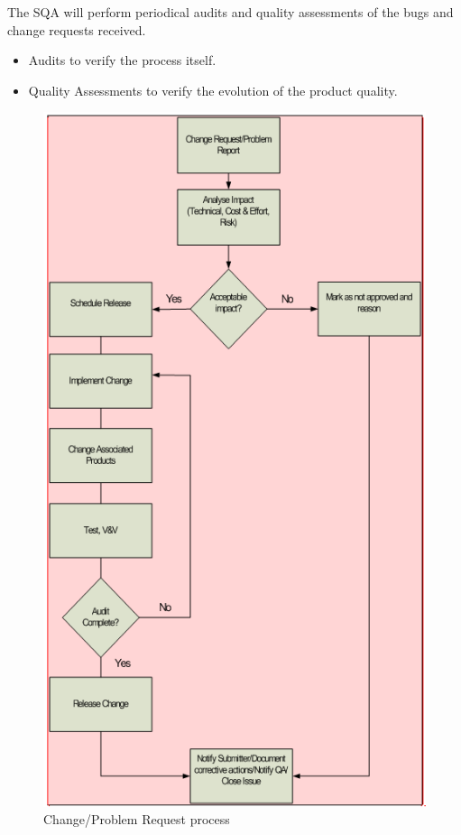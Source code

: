 \documentclass{template/openetcs_article}
\begin{document}
The SQA will perform periodical audits and quality assessments of the bugs and change requests received. 
\begin{itemize}
\item Audits to verify the process itself.
\item Quality Assessments to verify the evolution of the product quality. 
\end{itemize}


\begin{figure}
\centering
\includegraphics[scale=1.3]{./figures/changerequest.PNG}
\caption{Change/Problem Request process}
\end{figure}
\end{document}
